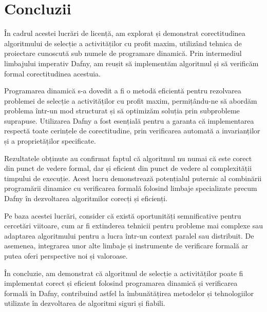 \chapter*{Concluzii} 
În cadrul acestei lucrări de licență, am explorat și demonstrat corectitudinea algoritmului de selecție a activităților cu profit maxim, utilizând tehnica de proiectare cunoscută sub numele de programare dinamică. Prin intermediul limbajului imperativ Dafny, am reușit să implementăm algoritmul și să verificăm formal corectitudinea acestuia.

Programarea dinamică s-a dovedit a fi o metodă eficientă pentru rezolvarea problemei de selecție a activităților cu profit maxim, permițându-ne să abordăm problema într-un mod structurat și să optimizăm soluția prin subprobleme suprapuse. Utilizarea Dafny a fost esențială pentru a garanta că implementarea respectă toate cerințele de corectitudine, prin verificarea automată a invarianților și a proprietăților specificate.

Rezultatele obținute au confirmat faptul că algoritmul nu numai că este corect din punct de vedere formal, dar și eficient din punct de vedere al complexității timpului de execuție. Acest lucru demonstrează potențialul puternic al combinării programării dinamice cu verificarea formală folosind limbaje specializate precum Dafny în dezvoltarea algoritmilor corecți și eficienți.

Pe baza acestei lucrări, consider că există oportunități semnificative pentru cercetări viitoare, cum ar fi extinderea tehnicii pentru probleme mai complexe sau adaptarea algoritmului pentru a lucra într-un context paralel sau distribuit. De asemenea, integrarea unor alte limbaje și instrumente de verificare formală ar putea oferi perspective noi și valoroase.

În concluzie, am demonstrat că algoritmul de selecție a activităților poate fi implementat corect și eficient folosind programarea dinamică și verificarea formală în Dafny, contribuind astfel la îmbunătățirea metodelor și tehnologiilor utilizate în dezvoltarea de algoritmi siguri și fiabili.